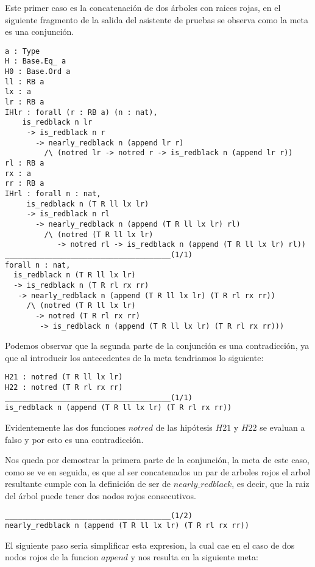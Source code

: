 Este primer caso es la concatenaci\'on de dos \'arboles con raices rojas, en el siguiente
fragmento de la salida del asistente de pruebas se observa como la meta es una conjunci\'on.

\begin{verbatim}
a : Type
H : Base.Eq_ a
H0 : Base.Ord a
ll : RB a
lx : a
lr : RB a
IHlr : forall (r : RB a) (n : nat),
    is_redblack n lr
     -> is_redblack n r
       -> nearly_redblack n (append lr r)
         /\ (notred lr -> notred r -> is_redblack n (append lr r))
rl : RB a
rx : a
rr : RB a
IHrl : forall n : nat,
     is_redblack n (T R ll lx lr)
     -> is_redblack n rl
       -> nearly_redblack n (append (T R ll lx lr) rl)
         /\ (notred (T R ll lx lr)
            -> notred rl -> is_redblack n (append (T R ll lx lr) rl))
______________________________________(1/1)
forall n : nat,
  is_redblack n (T R ll lx lr)
  -> is_redblack n (T R rl rx rr)
   -> nearly_redblack n (append (T R ll lx lr) (T R rl rx rr))
     /\ (notred (T R ll lx lr)
       -> notred (T R rl rx rr)
        -> is_redblack n (append (T R ll lx lr) (T R rl rx rr)))
\end{verbatim}

Podemos observar que la segunda parte de la conjunci\'on es una contradicci\'on, ya que al
introducir los antecedentes de la meta tendriamos lo siguiente:

\begin{verbatim}
H21 : notred (T R ll lx lr)
H22 : notred (T R rl rx rr)
______________________________________(1/1)
is_redblack n (append (T R ll lx lr) (T R rl rx rr))
\end{verbatim}

Evidentemente las dos funciones $notred$ de las hip\'otesis $H21$ y $H22$ se evaluan a falso y por
esto es una contradicci\'on.

Nos queda por demostrar la primera parte de la conjunci\'on, la meta de este caso, como se ve en
seguida, es que al ser concatenados un par de arboles rojos el arbol resultante cumple con la
definici\'on de ser de $nearly\_redblack$, es decir, que la raiz del \'arbol puede tener dos nodos
rojos consecutivos.

\begin{verbatim}
______________________________________(1/2)
nearly_redblack n (append (T R ll lx lr) (T R rl rx rr))
\end{verbatim}

El siguiente paso seria simplificar esta expresion, la cual cae en el caso de dos nodos rojos de la funcion $append$ y nos resulta en la siguiente meta:

